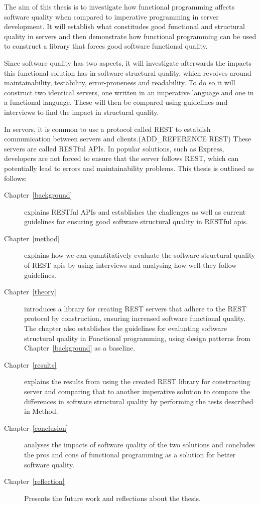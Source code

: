The aim of this thesis is to investigate how functional programming affects
software quality when compared to imperative programming in server development.
It will establish what constitudes good functional and structural quality in
servers and then demonstrate how functional programming can be used to construct
a library that forces good software functional quality. 

Since software quality has two aspects, it will investigate afterwards the
impacts this functional solution has in software structural quality, which
revolves around maintainability, testability, error-proneness and readability.
To do so it will construct two identical servers, one written in an imperative
language and one in a functional language.  These will then be compared using
guidelines and interviews to find the impact in structural quality.

In servers, it is common to use a protocol called REST to establish
communication between servers and clients.(ADD\_REFERENCE REST) These servers
are called RESTful APIs. In popular solutions, such as Express, developers are
not forced to ensure that the server follows REST, which can potentially lead to
errors and maintainability problems. This thesis is outlined as follows:

\begin{description}
    \item[Chapter~\ref{background}] explains RESTful APIs and establishes the
    challenges as well as current guidelines for ensuring good software
    structural quality in RESTful apis. 
    \item[Chapter~\ref{method}] explains how we can quantitatively evaluate the
    software structural quality of REST apis by using interviews and analysing
    how well they follow guidelines. 
    \item[Chapter~\ref{theory}] introduces a library for creating REST servers
    that adhere to the REST protocol by construction, ensuring increased
    software functional quality. The chapter also establishes the guidelines for
    evaluating software structural quality in Functional programming, using
    design patterns from Chapter~\ref{background} as a baseline.   
    \item[Chapter~\ref{results}] explains the results from using the created
    REST library for constructing server and comparing that to another
    imperative solution to compare the differences in software structural
    quality by performing the tests described in Method.
    \item[Chapter~\ref{conclusion}] analyses the impacts of software quality of
    the two solutions and concludes the pros and cons of functional programming
    as a solution for better software quality.
    \item[Chapter~\ref{reflection}] Presents the future work and reflections
    about the thesis.
\end{description}

